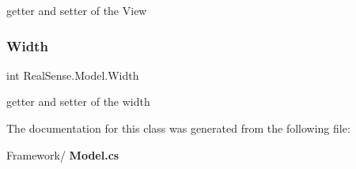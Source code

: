 getter and setter of the View \mbox{\label{class_real_sense_1_1_model_a20e2b5bc79da762b436b75ddd28f63b7}} 
\subsubsection{Width}
{\footnotesize\ttfamily int Real\+Sense.\+Model.\+Width\hspace{0.3cm}{\ttfamily [get]}}

getter and setter of the width 

The documentation for this class was generated from the following file\+:\begin{DoxyCompactItemize}
\item 
Framework/\textbf{ Model.\+cs}\end{DoxyCompactItemize}
